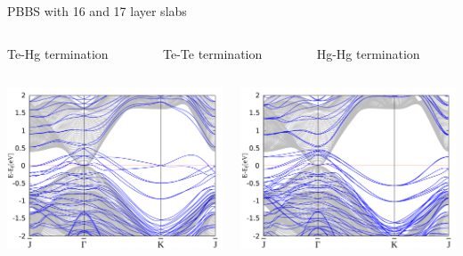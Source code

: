 \begin{frame}{PBBS with 16 and 17 layer slabs}
	\begin{columns}
		\begin{column}{.34\linewidth}
			\centering
			Te-Hg termination
		\end{column}
		\begin{column}{.34\linewidth}
			\centering
			Te-Te termination
		\end{column}
		\begin{column}{.34\linewidth}
			\centering
			Hg-Hg termination
		\end{column}
	\end{columns}
	\begin{columns}
		\begin{column}{.34\linewidth}
			\centering 
			\includegraphics[width=\linewidth]{Te_and_Hg_termination/no_H_bulk+16_layers_no_dos_-2_2.pdf}
		\end{column}
		\begin{column}{.34\linewidth}
			\centering 
			\includegraphics[width=\linewidth]{Te_termination/no_H_bulk+17_layers_no_dos_-2_2.pdf}

\end{column}
\end{columns}
\end{frame}
